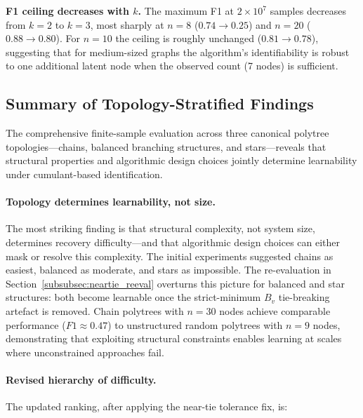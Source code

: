 \documentclass[11pt,a4paper]{article}
\numberwithin{equation}{section}
\begin{document}
\textbf{F1 ceiling decreases with $k$.}  The maximum F1 at $2 \times 10^7$ samples
decreases from $k=2$ to $k=3$, most sharply at $n=8$ ($0.74 \to 0.25$) and $n=20$
($0.88 \to 0.80$).  For $n=10$ the ceiling is roughly unchanged ($0.81 \to 0.78$),
suggesting that for medium-sized graphs the algorithm's identifiability is robust to
one additional latent node when the observed count (7 nodes) is sufficient.

\FloatBarrier
\subsection{Summary of Topology-Stratified Findings}

\begin{sloppypar}
The comprehensive finite-sample evaluation across three canonical polytree topologies---chains, balanced branching structures, and stars---reveals that structural properties and algorithmic design choices jointly determine learnability under cumulant-based identification.
\end{sloppypar}

\paragraph{Topology determines learnability, not size.}
The most striking finding is that structural complexity, not system size, determines
recovery difficulty---and that algorithmic design choices can either mask or resolve
this complexity.  The initial experiments suggested chains as easiest, balanced as
moderate, and stars as impossible.  The re-evaluation in
Section~\ref{subsubsec:neartie_reeval} overturns this picture for balanced and star
structures: both become learnable once the strict-minimum $B_v$ tie-breaking artefact
is removed.  Chain polytrees with $n=30$ nodes achieve comparable performance
($F1 \approx 0.47$) to unstructured random polytrees with $n=9$ nodes, demonstrating
that exploiting structural constraints enables learning at scales where unconstrained
approaches fail.

\paragraph{Revised hierarchy of difficulty.}
The updated ranking, after applying the near-tie tolerance fix, is:
\end{document}
